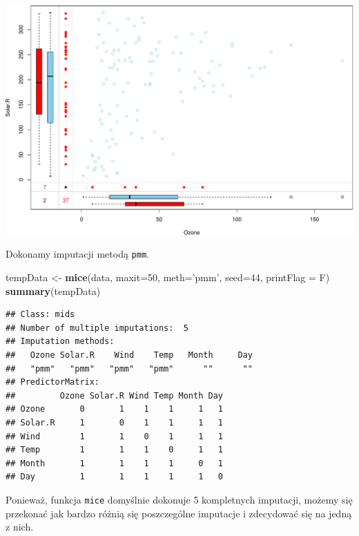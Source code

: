 \documentclass[
]{book}
\newenvironment{Shaded}{\begin{snugshade}}{\end{snugshade}}
\newcommand{\DataTypeTok}[1]{\textcolor[rgb]{0.13,0.29,0.53}{#1}}
\newcommand{\DecValTok}[1]{\textcolor[rgb]{0.00,0.00,0.81}{#1}}
\newcommand{\KeywordTok}[1]{\textcolor[rgb]{0.13,0.29,0.53}{\textbf{#1}}}
\newcommand{\NormalTok}[1]{#1}
\newcommand{\OperatorTok}[1]{\textcolor[rgb]{0.81,0.36,0.00}{\textbf{#1}}}
\newcommand{\StringTok}[1]{\textcolor[rgb]{0.31,0.60,0.02}{#1}}
\theoremstyle{plain}
\theoremstyle{definition}
\theoremstyle{definition}
\theoremstyle{definition}
\theoremstyle{definition}
\theoremstyle{remark}
\begin{document}
\includegraphics{EksploracjaDanych_files/figure-latex/unnamed-chunk-5-1.pdf}

Dokonamy imputacji metodą \texttt{pmm}.

\begin{Shaded}
\begin{Highlighting}[]
\NormalTok{tempData <-}\StringTok{ }\KeywordTok{mice}\NormalTok{(data, }
                 \DataTypeTok{maxit=}\DecValTok{50}\NormalTok{, }
                 \DataTypeTok{meth=}\StringTok{'pmm'}\NormalTok{, }
                 \DataTypeTok{seed=}\DecValTok{44}\NormalTok{, }
                 \DataTypeTok{printFlag =}\NormalTok{ F)}
\KeywordTok{summary}\NormalTok{(tempData)}
\end{Highlighting}
\end{Shaded}

\begin{verbatim}
## Class: mids
## Number of multiple imputations:  5 
## Imputation methods:
##   Ozone Solar.R    Wind    Temp   Month     Day 
##   "pmm"   "pmm"   "pmm"   "pmm"      ""      "" 
## PredictorMatrix:
##         Ozone Solar.R Wind Temp Month Day
## Ozone       0       1    1    1     1   1
## Solar.R     1       0    1    1     1   1
## Wind        1       1    0    1     1   1
## Temp        1       1    1    0     1   1
## Month       1       1    1    1     0   1
## Day         1       1    1    1     1   0
\end{verbatim}

Ponieważ, funkcja \texttt{mice} domyślnie dokonuje 5 kompletnych imputacji, możemy się przekonać jak bardzo różnią się poszczególne imputacje i zdecydować się na jedną z nich.

\begin{Shaded}
\end{Shaded}
\end{document}
